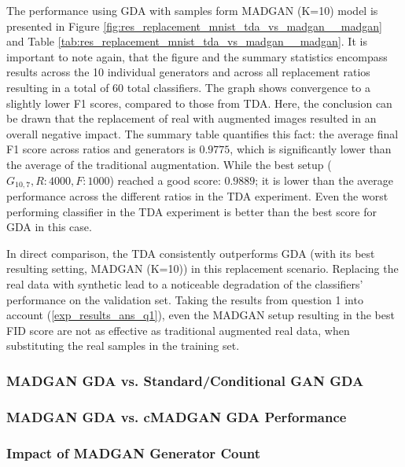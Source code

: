 The performance using GDA with samples form MADGAN (K=10) model is presented in Figure \ref{fig:res_replacement_mnist_tda_vs_madgan__madgan} and Table \ref{tab:res_replacement_mnist_tda_vs_madgan__madgan}. It is important to note again, that the figure and the summary statistics encompass results across the 10 individual generators and across all replacement ratios resulting in a total of $60$ total classifiers. The graph shows convergence to a slightly lower F1 scores, compared to those from TDA. Here, the conclusion can be drawn that the replacement of real with augmented images resulted in an overall negative impact. The summary table quantifies this fact: the average final F1 score across ratios and generators is $0.9775$, which is significantly lower than the average of the traditional augmentation. While the best setup (\(G_{10,7}, R:4000, F:1000\)) reached a good score: $0.9889$; it is lower than the average performance across the different ratios in the TDA experiment. Even the worst performing classifier in the TDA experiment is better than the best score for GDA in this case. 

In direct comparison, the TDA consistently outperforms GDA (with its best resulting setting, MADGAN (K=10)) in this replacement scenario. Replacing the real data with synthetic lead to a noticeable degradation of the classifiers' performance on the validation set. Taking the results from question 1 into account (\ref{exp_results_ans_q1}), even the MADGAN setup resulting in the best FID score are not as effective as traditional augmented real data, when substituting the real samples in the training set. 

\subsubsection[Question 3]{MADGAN GDA vs. Standard/Conditional GAN GDA} \label{exp_results_ans_q3} 
 
\subsubsection[Question 4]{MADGAN GDA vs. cMADGAN GDA Performance}      \label{exp_results_ans_q4} 
 

\subsubsection[Question 5]{Impact of MADGAN Generator Count}            \label{exp_results_ans_q5} 
 


\newpage
